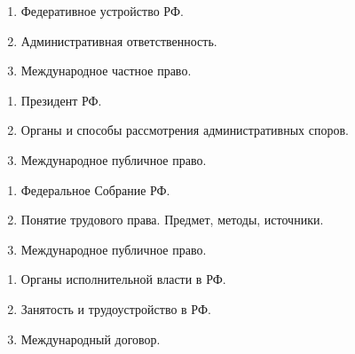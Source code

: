 \newpage


\shapkFull
\setcounter{zad}{0}

\begin{enumerate}
	\item Федеративное устройство РФ.

	\item Административная ответственность.

	\item Международное частное право.

\end{enumerate}

\newpage


\shapkFull
\setcounter{zad}{0}

\begin{enumerate}
	\item Президент РФ.

	\item Органы и способы рассмотрения административных споров.

	\item Международное публичное право.

\end{enumerate}

\newpage


\shapkFull
\setcounter{zad}{0}

\begin{enumerate}
	\item Федеральное Собрание РФ.

	\item Понятие трудового права. Предмет, методы, источники.

	\item Международное публичное право.

\end{enumerate}

\newpage


\shapkFull
\setcounter{zad}{0}

\begin{enumerate}
	\item Органы исполнительной власти в РФ.

	\item Занятость и трудоустройство в РФ.

	\item Международный договор.

\end{enumerate}

